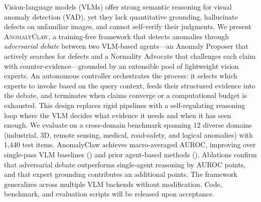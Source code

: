 Vision-language models (VLMs) offer strong semantic reasoning for visual anomaly detection (VAD), yet they lack quantitative grounding, hallucinate defects on unfamiliar images, and cannot self-verify their judgments.
We present \textsc{AnomalyClaw}, a training-free framework that detects anomalies through \emph{adversarial debate} between two VLM-based agents---an Anomaly Proposer that actively searches for defects and a Normality Advocate that challenges each claim with counter-evidence---grounded by an extensible pool of lightweight vision experts.
An autonomous controller orchestrates the process: it selects which experts to invoke based on the query context, feeds their structured evidence into the debate, and terminates when claims converge or a computational budget is exhausted.
This design replaces rigid pipelines with a self-regulating reasoning loop where the VLM decides what evidence it needs and when it has seen enough.
We evaluate on a cross-domain benchmark spanning 12 diverse domains (industrial, 3D, remote sensing, medical, road-safety, and logical anomalies) with 1{,}440 test items.
AnomalyClaw achieves  macro-averaged AUROC, improving over single-pass VLM baselines () and prior agent-based methods ().
Ablations confirm that adversarial debate outperforms single-agent reasoning by  AUROC points, and that expert grounding contributes an additional  points.
The framework generalizes across multiple VLM backends without modification.
Code, benchmark, and evaluation scripts will be released upon acceptance.
